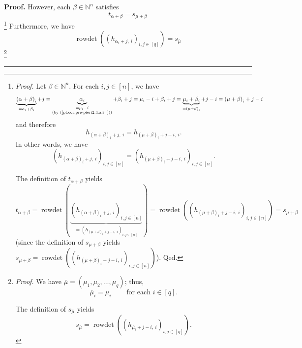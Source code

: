 \documentclass[numbers=enddot,12pt,final,onecolumn,notitlepage,english]{scrartcl}%
\theoremstyle{definition}
\newenvironment{proof}[1][Proof]{\noindent\textbf{#1.} }{\ \rule{0.5em}{0.5em}}
\newenvironment{verlong}{}{}
\begin{document}
\begin{verlong}
\begin{proof}
However, each $\beta\in\mathbb{N}^{n}$ satisfies
\begin{equation}
t_{\alpha+\beta}=s_{\mu+\beta} \label{pf.cor.pre-pieri2.4.3}%
\end{equation}
\footnote{\textit{Proof.} Let $\beta\in\mathbb{N}^{n}$. For each
$i,j\in\left[  n\right]  $, we have%
\[
\underbrace{\left(  \alpha+\beta\right)  _{i}}_{=\alpha_{i}+\beta_{i}%
}+j=\underbrace{\alpha_{i}}_{\substack{=\mu_{i}-i\\\text{(by
(\ref{pf.cor.pre-pieri2.4.ali=}))}}}+\beta_{i}+j=\mu_{i}-i+\beta
_{i}+j=\underbrace{\mu_{i}+\beta_{i}}_{=\left(  \mu+\beta\right)  _{i}%
}+j-i=\left(  \mu+\beta\right)  _{i}+j-i
\]
and therefore
\[
h_{\left(  \alpha+\beta\right)  _{i}+j,\ i}=h_{\left(  \mu+\beta\right)
_{i}+j-i,\ i}.
\]
In other words, we have%
\[
\left(  h_{\left(  \alpha+\beta\right)  _{i}+j,\ i}\right)  _{i,j\in\left[
n\right]  }=\left(  h_{\left(  \mu+\beta\right)  _{i}+j-i,\ i}\right)
_{i,j\in\left[  n\right]  }.
\]
\par
The definition of $t_{\alpha+\beta}$ yields
\[
t_{\alpha+\beta}=\operatorname*{rowdet}\left(  \underbrace{\left(  h_{\left(
\alpha+\beta\right)  _{i}+j,\ i}\right)  _{i,j\in\left[  n\right]  }%
}_{=\left(  h_{\left(  \mu+\beta\right)  _{i}+j-i,\ i}\right)  _{i,j\in\left[
n\right]  }}\right)  =\operatorname*{rowdet}\left(  \left(  h_{\left(
\mu+\beta\right)  _{i}+j-i,\ i}\right)  _{i,j\in\left[  n\right]  }\right)
=s_{\mu+\beta}%
\]
(since the definition of $s_{\mu+\beta}$ yields $s_{\mu+\beta}%
=\operatorname*{rowdet}\left(  \left(  h_{\left(  \mu+\beta\right)
_{i}+j-i,\ i}\right)  _{i,j\in\left[  n\right]  }\right)  $). Qed.}
Furthermore, we have
\begin{equation}
\operatorname*{rowdet}\left(  \left(  h_{\alpha_{i}+j,\ i}\right)
_{i,j\in\left[  q\right]  }\right)  =s_{\overline{\mu}}
\label{pf.cor.pre-pieri2.4.4}%
\end{equation}
\footnote{\textit{Proof.} We have $\overline{\mu}=\left(  \mu_{1},\mu
_{2},\ldots,\mu_{q}\right)  $; thus,
\begin{equation}
\overline{\mu}_{i}=\mu_{i}\ \ \ \ \ \ \ \ \ \ \text{for each }i\in\left[
q\right]  . \label{pf.cor.pre-pieri2.4.4.pf.1}%
\end{equation}
\par
The definition of $s_{\overline{\mu}}$ yields%
\begin{equation}
s_{\overline{\mu}}=\operatorname*{rowdet}\left(  \left(  h_{\overline{\mu}%
_{i}+j-i,\ i}\right)  _{i,j\in\left[  q\right]  }\right)  .
\label{pf.cor.pre-pieri2.4.4.pf.2}%

\end{equation}}
\end{proof}
\end{verlong}
\end{document}
